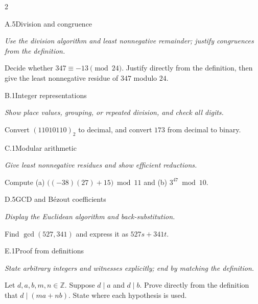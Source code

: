\documentclass[9pt]{extarticle}
\begin{document}
\begin{multicols}{2}
\begin{CoreProblem}{A.5}{Division and congruence}
{\scriptsize\textit{Use the division algorithm and least nonnegative remainder; justify congruences from the definition.}\par}
Decide whether $347\equiv-13\pmod{24}$. Justify directly from the definition,
then give the least nonnegative residue of $347$ modulo $24$.
\end{CoreProblem}
\begin{CoreProblem}{B.1}{Integer representations}
{\scriptsize\textit{Show place values, grouping, or repeated division, and check all digits.}\par}
Convert $(11010110)_2$ to decimal, and convert $173$ from decimal to binary.
\end{CoreProblem}
\begin{CoreProblem}{C.1}{Modular arithmetic}
{\scriptsize\textit{Give least nonnegative residues and show efficient reductions.}\par}
Compute (a) $\bigl((-38)(27)+15\bigr)\bmod11$ and
(b) $3^{47}\bmod10$.
\end{CoreProblem}
\columnbreak
\begin{CoreProblem}{D.5}{GCD and B\'ezout coefficients}
{\scriptsize\textit{Display the Euclidean algorithm and back-substitution.}\par}
Find $\gcd(527,341)$ and express it as $527s+341t$.
\end{CoreProblem}
\begin{CoreProblem}{E.1}{Proof from definitions}
{\scriptsize\textit{State arbitrary integers and witnesses explicitly; end by matching the definition.}\par}
Let $d,a,b,m,n\in\mathbb Z$. Suppose $d\mid a$ and $d\mid b$. Prove directly
from the definition that $d\mid(ma+nb)$. State where each hypothesis is used.
\end{CoreProblem}
\end{multicols}
\CoreWorkArea
\FormBreak
{}
\end{document}
